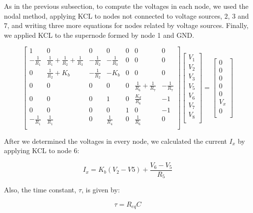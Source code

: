 As in the previous subsection, to compute the voltages in each node, we used the nodal method, applying KCL to nodes not connected to voltage sources, $2$, $3$ and $7$, and writing three more equations for nodes related by voltage sources. Finally, we applied KCL to the supernode formed by node 1 and GND.

\[
{\begin{bmatrix}
1 & 0 & 0 & 0 & 0 & 0 & 0\\
-\frac{1}{R_1} & \frac{1}{R_1}+\frac{1}{R_2}+\frac{1}{R_3} & -\frac{1}{R_2} & -\frac{1}{R_3} & 0 & 0 & 0\\
0 & \frac{1}{R_2}+K_b & -\frac{1}{R_2} & -K_b & 0 & 0 & 0\\
0 & 0 & 0 & 0 & 0 & \frac{1}{R_6}+\frac{1}{R_7} & -\frac{1}{R_7}\\
0 & 0 & 0 & 1 & 0 & \frac{K_d}{R_6} & -1\\
0 & 0 & 0 & 0 & 1 & 0 & -1\\
-\frac{1}{R_1} & \frac{1}{R_1} & 0 & \frac{1}{R_4} & 0 & \frac{1}{R_6} & 0\\
            \end{bmatrix}
            }
{\begin{bmatrix}
V_1\\
V_2\\
V_3\\
V_5\\
V_6\\
V_7\\
V_8\\
            \end{bmatrix}
            }
    =
{\begin{bmatrix}
0\\
0\\
0\\
0\\
0\\
V_x\\
0\\
            \end{bmatrix}
            }
\]

After we determined the voltages in every node, we calculated the current $I_x$ by applying KCL to node 6:

\begin{equation}
  I_x = K_b(V_2-V5)+\frac{V_6-V_5}{R_5}
\end{equation}

Also, the time constant, $\tau$, is given by:

\begin{equation}
  \tau = R_{eq}C
\end{equation}

